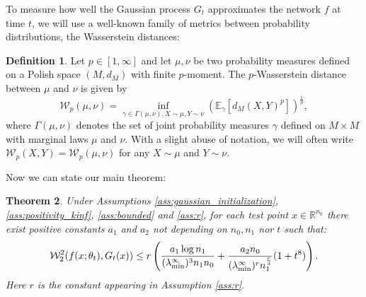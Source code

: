\documentclass{article}
\newtheorem{thm}{Theorem}[section]
\theoremstyle{definition}
\newtheorem{defn}[thm]{Definition}
\theoremstyle{remark}
\numberwithin{equation}{section}
\newcommand{\X}{\mathcal{X}}
\newcommand{\R}{\mathbb{R}}
\newcommand{\E}{\mathbb{E}}
\newcommand{\lammin}{\lambda_{\textup{min}}}
\newcommand{\norm}[2]{
    \|#1\|_{#2}
}
\begin{document}
To measure how well the Gaussian process $G_t$ approximates the network $f$ at time $t$, we will use a well-known family of metrics between probability distributions, the Wasserstein distances:
\begin{defn}
    Let $p \in [1, \infty]$ and let $\mu, \nu$ be two probability measures defined on a Polish space $(M,d_M)$ with finite $p$-moment.
    The $p$-Wasserstein distance between $\mu$ and $\nu$ is given by
    \[
    \mathcal W_p (\mu, \nu) = \inf_{\gamma \in \Gamma(\mu, \nu), X\sim \mu, Y \sim \nu} \left( \E_\gamma \left[ d_M(X,Y)^p \right] \right)^{\frac{1}{p}},
    \]
    where $\Gamma(\mu, \nu)$ denotes the set of joint probability measures $\gamma$ defined on $M \times M$ with marginal laws $\mu$ and $\nu$.
    With a slight abuse of notation, we will often write $\mathcal W_p (X, Y) =\mathcal W_p (\mu, \nu)$ for any $X\sim \mu$ and $Y\sim \nu$.
\end{defn}

Now we can state our main theorem:


\color{black}
\begin{thm}
    \label{thm:main}
    Under Assumptions \ref{ass:gaussian_initialization},
    \ref{ass:positivity_kinf},
    \ref{ass:bounded} and \ref{ass:r},
    for each test point $x\in \R^{n_0}$ there exist positive constants $a_1$ and $a_2$ not depending on $n_0,n_1$ nor $t$ such that:
    \[
        \mathcal W_2^2(f(x;\theta_t),G_t(x)) \le r\left(\frac{a_1\log n_1}{(\lammin^\infty)^3n_1n_0}+\frac{a_2  n_0}{(\lammin^\infty)^rn_1^\frac{r}{4}}(1+t^8)\right).
    \]
    Here $r$ is the constant appearing in Assumption \ref{ass:r}.
\end{thm}
\end{document}
